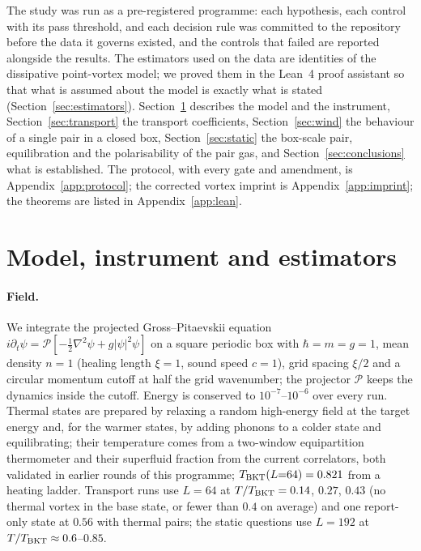 \documentclass[11pt,a4paper]{article}
\begin{document}
The study was run as a pre-registered programme: each hypothesis, each control with its pass threshold, and each
decision rule was committed to the repository before the data it governs existed, and the controls that failed are
reported alongside the results. The estimators used on the data are identities of the dissipative point-vortex
model; we proved them in the Lean~4 proof assistant so that what is assumed about the model is exactly what is
stated (Section~\ref{sec:estimators}). Section~\ref{sec:model} describes the model and the instrument,
Section~\ref{sec:transport} the transport coefficients, Section~\ref{sec:wind} the behaviour of a single pair in a
closed box, Section~\ref{sec:static} the box-scale pair, equilibration and the polarisability of the pair gas, and
Section~\ref{sec:conclusions} what is established. The protocol, with every gate and amendment, is
Appendix~\ref{app:protocol}; the corrected vortex imprint is Appendix~\ref{app:imprint}; the theorems are listed in
Appendix~\ref{app:lean}.

\section{Model, instrument and estimators}\label{sec:model}

\paragraph{Field.} We integrate the projected Gross--Pitaevskii equation
$i\partial_t\psi=\mathcal P[-\tfrac12\nabla^2\psi+g|\psi|^2\psi]$ on a square periodic box with $\hbar=m=g=1$,
mean density $n=1$ (healing length $\xi=1$, sound speed $c=1$), grid spacing $\xi/2$ and a circular momentum cutoff
at half the grid wavenumber; the projector $\mathcal P$ keeps the dynamics inside the cutoff. Energy is conserved to
$10^{-7}$--$10^{-6}$ over every run. Thermal states are prepared by relaxing a random high-energy field at the target
energy and, for the warmer states, by adding phonons to a colder state and equilibrating; their temperature comes
from a two-window equipartition thermometer and their superfluid fraction from the current correlators, both
validated in earlier rounds of this programme; $T_{\rm BKT}(L{=}64)=0.821$ from a heating ladder. Transport runs use
$L=64$ at $T/T_{\rm BKT}=0.14$, $0.27$, $0.43$ (no thermal vortex in the base state, or fewer than $0.4$ on average)
and one report-only state at $0.56$ with thermal pairs; the static questions use $L=192$ at $T/T_{\rm BKT}\approx0.6$--$0.85$.
\end{document}
